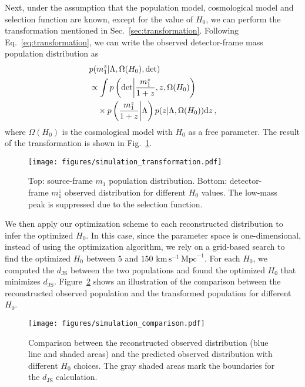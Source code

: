 \documentclass[sn-aps, pdflatex, iicol]{sn-jnl}
\begin{document}
Next, under the assumption that the population model, cosmological model and selection function are known, except for the value of $H_0$, we can perform the transformation mentioned in Sec.~\ref{sec:transformation}.
Following Eq.~\eqref{eq:transformation}, we can write the observed detector-frame mass population distribution as
\begin{equation}
    \mathtoolsset{multlined-width=0.89\displaywidth}
    \begin{aligned}
        &p(m^z_1|\Lambda, \Omega(H_0), \mathrm{det}) \\
        &\begin{multlined}
            \propto \int p\left(\mathrm{det}\middle|\frac{m^z_1}{1+z},z,\Omega(H_0)\right) \\ \times p\left(\frac{m^z_1}{1+z}\middle|\Lambda\right)p(z|\Lambda, \Omega(H_0)) \mathrm{d}z\,,
        \end{multlined}
    \end{aligned}
\end{equation}
where $\Omega(H_0)$ is the cosmological model with $H_0$ as a free parameter.
The result of the transformation is shown in Fig.~\ref{fig:simulation_transformation}.
\begin{figure}
    \texttt{[image: figures/simulation\_transformation.pdf]}
    \caption{
        Top: source-frame $m_1$ population distribution.
        Bottom: detector-frame $m^z_1$ observed distribution for different $H_0$ values.
        The low-mass peak is suppressed due to the selection function.
    }
    \label{fig:simulation_transformation}
\end{figure}

We then apply our optimization scheme to each reconstructed distribution to infer the optimized $H_0$.
In this case, since the parameter space is one-dimensional, instead of using the optimization algorithm, we rely on a grid-based search to find the optimized $H_0$ between $5$ and $150$ $\mathrm{km}\,\mathrm{s}^{-1}\,\mathrm{Mpc}^{-1}$.
For each $H_0$, we computed the $d_\mathrm{JS}$ between the two populations and found the optimized $H_0$ that minimizes $d_\mathrm{JS}$.
Figure~\ref{fig:simulation_comparison} shows an illustration of the comparison between the reconstructed observed population and the transformed population for different $H_0$.
\begin{figure}
    \texttt{[image: figures/simulation\_comparison.pdf]}
    \caption{
        Comparison between the reconstructed observed distribution (blue line and shaded areas) and the predicted observed distribution with different $H_0$ choices.
        The gray shaded areas mark the boundaries for the $d_\mathrm{JS}$ calculation.
    }
    \label{fig:simulation_comparison}
\end{figure}
\end{document}
